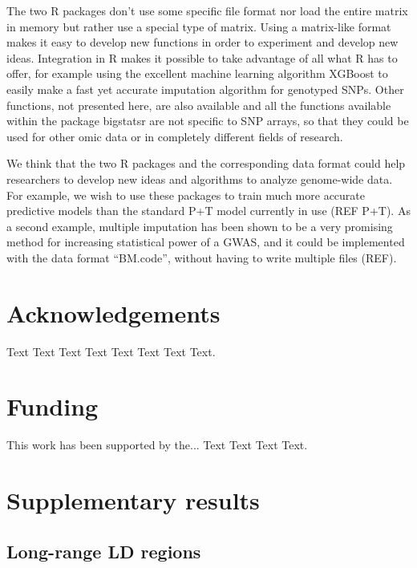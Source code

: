 \documentclass{bioinfo}
\begin{document}
The two R packages don't use some specific file format nor load the entire matrix in memory but rather use a special type of matrix. Using a matrix-like format makes it easy to develop new functions in order to experiment and develop new ideas. Integration in R makes it possible to take advantage of all what R has to offer, for example using the excellent machine learning algorithm XGBoost to easily make a fast yet accurate imputation algorithm for genotyped SNPs. Other functions, not presented here, are also available and all the functions available within the package bigstatsr are not specific to SNP arrays, so that they could be used for other omic data or in completely different fields of research.

We think that the two R packages and the corresponding data format could help researchers to develop new ideas and algorithms to analyze genome-wide data. For example, we wish to use these packages to train much more accurate predictive models than the standard P+T model currently in use (REF P+T). As a second example, multiple imputation has been shown to be a very promising method for increasing statistical power of a GWAS, and it could be implemented with the data format ``BM.code'', without having to write multiple files (REF).



\section*{Acknowledgements}

Text Text Text Text Text Text  Text Text. 

\section*{Funding}

This work has been supported by the... Text Text  Text Text.\vspace*{-12pt}




\newpage
\section*{Supplementary results}

\subsection{Long-range LD regions}
\end{document}
